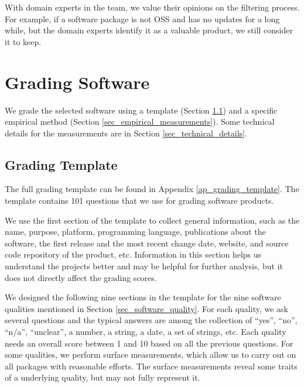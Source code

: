 With domain experts in the team, we value their opinions on the filtering process. For example, if a software package is not OSS and has no updates for a long while, but the domain experts identify it as a valuable product, we still consider it to keep.

\section{Grading Software}
\label{sec_grading_software}

We grade the selected software using a template (Section \ref{sec_grading_template}) and a specific empirical method (Section \ref{sec_empirical_measurements}). Some technical details for the measurements are in Section \ref{sec_technical_details}.

\subsection{Grading Template}
\label{sec_grading_template}
The full grading template can be found in Appendix \ref{ap_grading_template}. The template contains 101 questions that we use for grading software products.

We use the first section of the template to collect general information, such as the name, purpose, platform, programming language, publications about the software, the first release and the most recent change date, website, and source code repository of the product, etc. Information in this section helps us understand the projects better and may be helpful for further analysis, but it does not directly affect the grading scores.

We designed the following nine sections in the template for the nine software qualities mentioned in Section \ref{sec_software_quality}. For each quality, we ask several questions and the typical answers are among the collection of ``yes'', ``no'', ``n/a'', ``unclear'', a number, a string, a date, a set of strings, etc. Each quality needs an overall score between 1 and 10 based on all the previous questions. For some qualities, we perform surface measurements, which allow us to carry out on all packages with reasonable efforts. The surface measurements reveal some traits of a underlying quality, but may not fully represent it.

